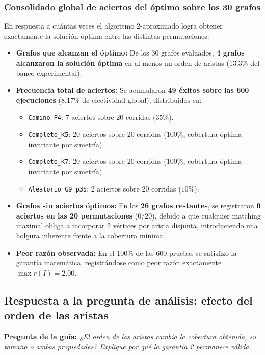 \subsubsection*{Consolidado global de aciertos del óptimo sobre los 30 grafos}
En respuesta a cuántas veces el algoritmo 2-aproximado logra obtener exactamente la solución óptima entre las distintas permutaciones:
\begin{itemize}
    \item \textbf{Grafos que alcanzan el óptimo:} De los 30 grafos evaluados, \textbf{4 grafos alcanzaron la solución óptima} en al menos un orden de aristas ($13.3\%$ del banco experimental).
    \item \textbf{Frecuencia total de aciertos:} Se acumularon \textbf{49 éxitos sobre las 600 ejecuciones} ($8.17\%$ de efectividad global), distribuidos en:
    \begin{itemize}
        \item \texttt{Camino\_P4}: 7 aciertos sobre 20 corridas ($35\%$).
        \item \texttt{Completo\_K5}: 20 aciertos sobre 20 corridas ($100\%$, cobertura óptima invariante por simetría).
        \item \texttt{Completo\_K7}: 20 aciertos sobre 20 corridas ($100\%$, cobertura óptima invariante por simetría).
        \item \texttt{Aleatorio\_G9\_p35}: 2 aciertos sobre 20 corridas ($10\%$).
    \end{itemize}
    \item \textbf{Grafos sin aciertos óptimos:} En los \textbf{26 grafos restantes}, se registraron \textbf{0 aciertos en las 20 permutaciones} (0/20), debido a que cualquier matching maximal obliga a incorporar 2 vértices por arista disjunta, introduciendo una holgura inherente frente a la cobertura mínima.
    \item \textbf{Peor razón observada:} En el 100\% de las 600 pruebas se satisfizo la garantía matemática, registrándose como peor razón exactamente $\max r(I) = 2.00$.
\end{itemize}

\subsection{Respuesta a la pregunta de análisis: efecto del orden de las aristas}
\textbf{Pregunta de la guía:} \textit{¿El orden de las aristas cambia la cobertura obtenida, su tamaño o ambas propiedades? Explique por qué la garantía 2 permanece válida.}


